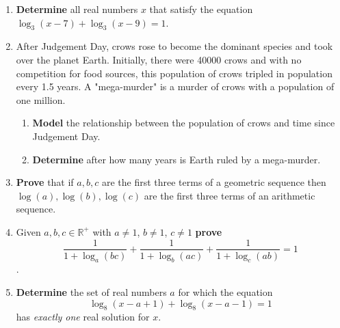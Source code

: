 \documentclass[12pt]{book}
\begin{document}
\begin{enumerate}

\item \textbf{Determine} all real numbers $x$ that satisfy the equation $\log_3(x-7) + \log_3(x-9) = 1$.



\newpage

\item After Judgement Day, crows rose to become the dominant species and took over the planet Earth. Initially, there were 40000 crows and with no competition for food sources, this population of crows tripled in population every 1.5 years. A "mega-murder" is a murder of crows with a population of one million.

\begin{enumerate}
\item \textbf{Model} the relationship between the population of crows and time since Judgement Day.
\item \textbf{Determine} after how many years is Earth ruled by a mega-murder.
\end{enumerate}


\newpage

\item \textbf{Prove} that if $a,b,c$ are the first three terms of a geometric sequence then $\log(a), \log(b), \log(c)$ are the first three terms of an arithmetic sequence.


\newpage


\item Given $a,b,c \in \mathbb{R^+}$ with $a\neq1$, $b\neq1$, $c\neq1$ \textbf{prove} $$\dfrac{1}{1+\log_a(bc)} + \dfrac{1}{1+\log_b(ac)} + \dfrac{1}{1+\log_c(ab)} = 1$$.


\newpage

\item \textbf{Determine} the set of real numbers $a$ for which the equation $$\log_8(x-a+1) + \log_8(x-a-1) =1$$ has \emph{exactly one} real solution for $x$.



\newpage


\end{enumerate}
\end{document}
